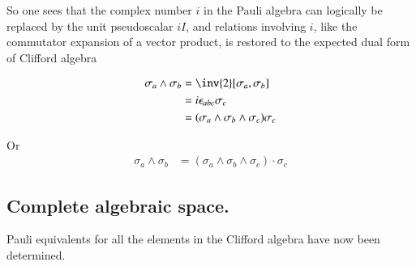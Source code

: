 \documentclass{article}
\newcommand{\antisymmetric}[2]{[{#1},{#2}]}
\begin{document}
So one sees that the complex number $i$ in the Pauli algebra can logically be
replaced by the unit pseudoscalar $i I$, and relations involving $i$, like the 
commutator expansion of a vector product, is restored to the expected
dual form of Clifford algebra

\begin{align*}
\sigma_a \wedge \sigma_b 
&= \inv{2} \antisymmetric{\sigma_a}{\sigma_b} \\
&= i \epsilon_{a b c} \sigma_c \\
&= (\sigma_a \wedge \sigma_b \wedge \sigma_c) \sigma_c \\
\end{align*}

Or
\begin{align}\label{eqn:dualBivector}
\sigma_a \wedge \sigma_b &= (\sigma_a \wedge \sigma_b \wedge \sigma_c) \cdot \sigma_c
\end{align}

\subsection{ Complete algebraic space. }

Pauli equivalents for all the elements in the Clifford algebra have now been
determined.
\end{document}
